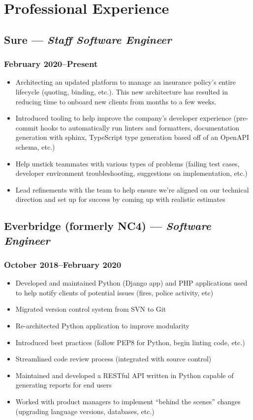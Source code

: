\documentclass{article}
\begin{document}
\begin{minipage}[t]{.6\textwidth}
	\section*{Professional Experience}
	\subsection*{Sure  --- \textit{Staff Software Engineer}}
	\subsubsection*{February 2020--Present}
	\begin{itemize}
		\item Architecting an updated platform to manage an insurance policy's
		      entire lifecycle (quoting, binding, etc.). This new architecture
		      has resulted in reducing time to onboard new clients from months
		      to a few weeks.
		\item Introduced tooling to help improve the company's developer
		      experience (pre-commit hooks to automatically run linters and
		      formatters, documentation generation with sphinx, TypeScript type
		      generation based off of an OpenAPI schema, etc.)
		\item Help unstick teammates with various types of problems (failing
		      test cases, developer environment troubleshooting, suggestions on
		      implementation, etc.)
		\item Lead refinements with the team to help ensure we're aligned on
		      our technical direction and set up for success by coming up with
		      realistic estimates
	\end{itemize}
	\subsection*{Everbridge (formerly NC4) --- \textit{Software Engineer}}
	\subsubsection*{October 2018--February 2020}
	\begin{itemize}
		\item Developed and maintained Python (Django app) and PHP applications
		      used to help notify clients of potential issues (fires, police
		      activity, etc)
		\item Migrated version control system from SVN to Git
		\item Re-architected Python application to improve modularity
		\item Introduced best practices (follow PEP8 for Python, begin linting code, etc.)
		\item Streamlined code review process (integrated with source control)
		\item Maintained and developed a RESTful API written in Python capable of generating
		      reports for end users
		\item Worked with product managers to implement ``behind the scenes'' changes
		      (upgrading language versions, databases, etc.)
	\end{itemize}

\end{minipage}
\end{document}
